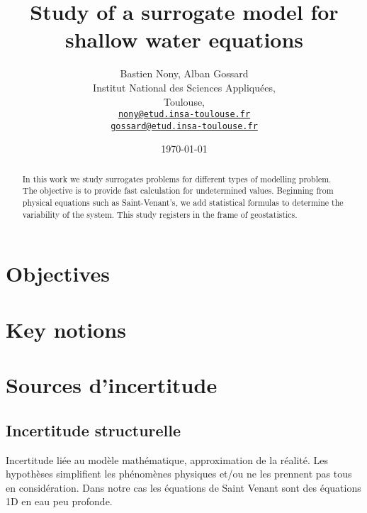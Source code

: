 \documentclass[hidelinks,12pt]{article}
\begin{document}
\title{Study of a surrogate model for shallow water equations}
\author{Bastien Nony, Alban Gossard\\
Institut National des Sciences Appliquées,\\
Toulouse,\\
\href{mailto:nony@etud.insa-toulouse.fr}{   \texttt{nony@etud.insa-toulouse.fr}}\\
\href{mailto:gossard@etud.insa-toulouse.fr}{   \texttt{gossard@etud.insa-toulouse.fr}}}
\date{\today}

\maketitle

\begin{abstract}
In this work we study surrogates problems for different types of modelling problem. The objective is to provide fast calculation for undetermined values. Beginning from physical equations such as Saint-Venant's, we add statistical formulas to determine the variability of the system. This study registers in the frame of geostatistics.
\end{abstract}

\newpage

\tableofcontents











\section{Objectives}
\section{Key notions}


\section{Sources d’incertitude}



\subsection{Incertitude structurelle }

Incertitude liée au modèle mathématique, approximation de la réalité. Les hypothèses simplifient les phénomènes physiques et/ou ne les prennent pas tous en considération. Dans notre cas les équations de Saint Venant sont des équations 1D en eau peu profonde.
\end{document}
